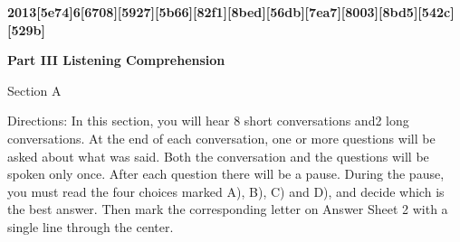 \documentclass[12pt]{article}
\begin{document}
\sloppy


\vspace{0.00mm}
\setlength{\parindent}{0.00mm}
\setlength{\leftskip}{-6.23mm}
\setlength{\rightskip}{0.00mm}

\textbf{2013[5e74]6[6708][5927][5b66][82f1][8bed][56db][7ea7][8003][8bd5][542c][529b]}
\vspace{0.00mm}

\vspace{0.00mm}
\setlength{\parindent}{0.00mm}
\setlength{\leftskip}{-6.23mm}
\setlength{\rightskip}{0.00mm}

\textbf{}
\vspace{0.00mm}

\vspace{0.00mm}
\setlength{\parindent}{0.00mm}
\setlength{\leftskip}{-6.23mm}
\setlength{\rightskip}{0.00mm}

\textbf{Part III Listening Comprehension}
\vspace{0.00mm}

\vspace{0.00mm}
\setlength{\parindent}{0.00mm}
\setlength{\leftskip}{-6.23mm}
\setlength{\rightskip}{0.00mm}


\vspace{0.00mm}

\vspace{0.00mm}
\setlength{\parindent}{0.00mm}
\setlength{\leftskip}{-6.23mm}
\setlength{\rightskip}{0.00mm}

Section A
\vspace{0.00mm}

\vspace{0.00mm}
\setlength{\parindent}{0.00mm}
\setlength{\leftskip}{-6.23mm}
\setlength{\rightskip}{0.00mm}


\vspace{0.00mm}

\vspace{0.00mm}
\setlength{\parindent}{0.00mm}
\setlength{\leftskip}{-6.23mm}
\setlength{\rightskip}{0.00mm}

Directions: In this section, you will hear 8 short conversations and2 long conversations. At the end of each conversation, one or more questions will be asked about what was said. Both the conversation and the questions will be spoken only once. After each question there will be a pause. During the pause, you must read the four choices marked A), B), C) and D), and decide which is the best answer. Then mark the corresponding letter on Answer Sheet 2 with a single line through the center.
\vspace{0.00mm}
\end{document}
